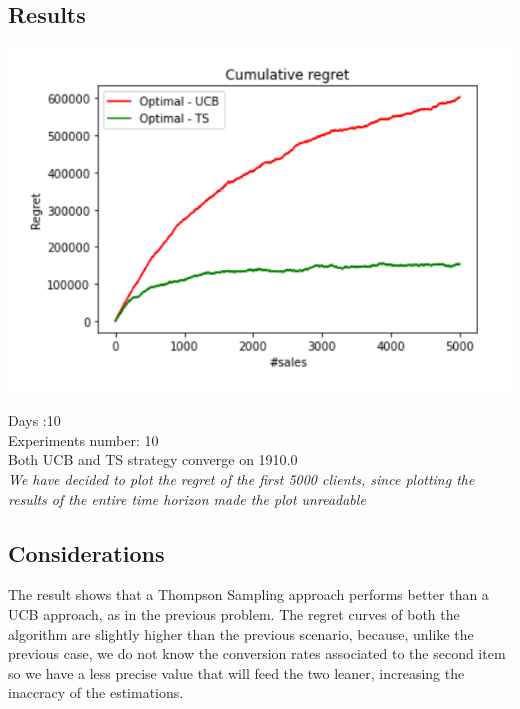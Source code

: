 \subsection*{Results}
\begin{center}
	\includegraphics[scale=1.2]{Images/n4}
\end{center}
Days :10\\
Experiments number: 10 \\
Both UCB and TS strategy converge on 1910.0\\
\textit{We have decided to plot the regret of the first 5000 clients, since plotting the results of the entire time horizon made the plot unreadable}

\subsection*{Considerations}
The result shows that a Thompson Sampling approach performs better than a UCB approach, as in the previous problem. The regret curves of both the algorithm are slightly higher than the previous scenario, because, unlike the previous case, we do not know the conversion rates associated to the second item so we have a less precise value that will feed the two leaner, increasing the inaccracy of the estimations.  
